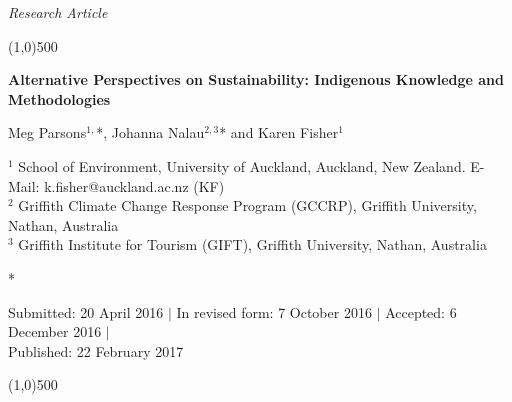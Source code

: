 \documentclass[10pt,a4paper]{article}
\begin{document}
\flushcolumns
\raggedcolumns



\pagestyle{document}
\thispagestyle{firstpage}


\vspace*{70pt}

\setlength{\parindent}{0cm}
\textit{Research Article}
\vspace*{-12pt}

\begin{center}
\line(1,0){500}
\end{center}

\vspace*{12pt}
\begin{flushleft}
\begin{LARGE}
\textbf{{\color{LibrelloColor} Alternative Perspectives on Sustainability: Indigenous Knowledge and Methodologies}}\\
\end{LARGE}

\vspace*{12pt}

Meg Parsons$^{1,}$*, Johanna Nalau$^{2,3}$* and Karen Fisher$^{1}$

\vspace*{6pt}

$^1$ School of Environment, University of Auckland, Auckland, New Zealand. E-Mail: k.fisher@auckland.ac.nz (KF)\\
$^2$ Griffith Climate Change Response Program (GCCRP), Griffith University, Nathan, Australia\\
$^3$ Griffith Institute for Tourism (GIFT), Griffith University, Nathan, Australia\\


\vspace*{6pt}

* 

\vspace*{6pt}

Submitted: 20 April 2016 $\mid$ In revised form: 7 October 2016 $\mid$ Accepted: 6 December 2016 $\mid$\\
Published: 22 February 2017
\end{flushleft}
\setcounter{page}{7}


\vspace*{-18pt}
\begin{center}
\line(1,0){500}
\end{center}
\end{document}
